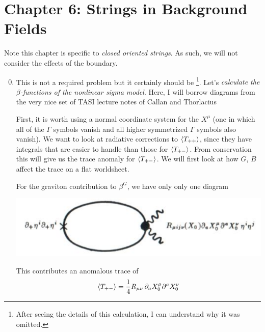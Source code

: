 \documentclass[11pt, class=article, crop=false]{standalone}
\begin{document}
\section*{Chapter 6: Strings in Background Fields} %
\label{sec:chapter_6_strings_in_background_fields}
Note this chapter is specific to \emph{closed oriented strings}. As such, we will not consider the effects of the boundary.
\begin{enumerate}
	\setcounter{enumi}{-1}
	\item This is not a required problem but it certainly should be \footnote{After seeing the details of this calculation, I can understand why it was omitted.}. Let's \emph{calculate the $\beta$-functions of the nonlinear sigma model}. Here, I will borrow diagrams from the very nice set of TASI lecture notes of Callan and Thorlacius 
	
	First, it is worth using a normal coordinate system for the $X^\mu$ (one in which all of the $\Gamma$ symbols vanish and all higher symmetrized $\Gamma$ symbols also vanish). %
	We want to look at radiative corrections to $\braket{T_{++}}$, since they have integrals that are easier to handle than those for $\braket{T_{+-}}$. From conservation this will give us the trace anomaly for $\braket{T_{+-}}$. We will first look at how $G$, $B$ affect the trace on a flat worldsheet.
	
	For the graviton contribution to $\beta^G$, we have only only one diagram
	\begin{center}
		\includegraphics[scale=0.6]{Figures/G}
	\end{center}
	This contributes an anomalous trace of
	\[
		\braket{T_{+-}} = \frac14 R_{\mu \nu} \, \partial_a X^\mu_0 \partial^a X^\nu_0
	\]
	

\end{enumerate}
\end{document}
